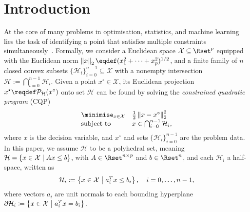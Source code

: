 \section{Introduction}

At the core of many problems in optimisation, statistics, and machine learning lies the task of identifying a point that satisfies multiple constraints simultaneously~\cite[Ch. 8]{BOYDCONVEX}. Formally, we consider a Euclidean space $\mathcal{X} \subseteq \Rset^p$ equipped with the Euclidean norm $\twonorm{x}\eqdef (x_1^2+\dots+x_p^2)^{1/2}$, and a finite family of $n$ closed convex subsets $\{\mathcal{H}_i\}_{i=0}^{n-1}\subseteq\mathcal{X}$ with a nonempty intersection $\mathcal{H} := \bigcap_{i=0}^{n-1} \mathcal{H}_i$. Given a point $x^\circ \in \mathcal{X}$, its Euclidean projection $x^\star \reqdef \mathcal{P}_{\mathcal{H}}(x^\circ)$ onto set $\mathcal{H}$ can be found by solving the \textit{constrained quadratic program} (CQP)
\begin{equation} \label{eq:projection}
\begin{array}{ll}
    {\displaystyle \minimise_{x\in\mathcal{X}}}  & \frac{1}{2}\twonorm{x-x^\circ}^2 \\
    \text{subject to} & x \in \bigcap_{i=0}^{n-1}\mathcal{H}_i,
\end{array}
\end{equation}
where $x$ is the decision variable, and $x^\circ$ and sets $\{\mathcal{H}_i\}_{i=0}^{n-1}$ are the problem data. In this paper, we assume $\mathcal{H}$ to be a polyhedral set, meaning $\mathcal{H}=\left\{ x \in \mathcal{X} \;\middle|\; A x \leq b \right\}$, with $A \in \Rset^{n\times p}$ and $b \in \Rset^n$, and each $\mathcal{H}_i$ a half-space, written as
\begin{align}\label{eq:sets_i}
\mathcal{H}_i\coloneqq\left\{ x\in\mathcal{X} \;\middle|\; a_i^Tx \leq b_i \right\}, \quad i=0,\dots,n-1,
\end{align}
where vectors $a_i$ are unit normals to each bounding hyperplane $\partial\mathcal{H}_i\coloneqq\left\{ x\in\mathcal{X} \;\middle|\; a_i^Tx = b_i \right\}$.

